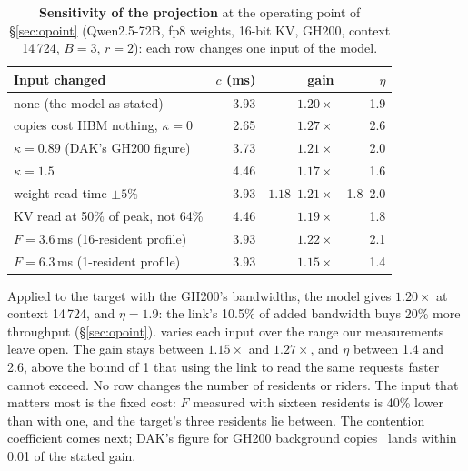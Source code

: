 \begin{table}[t]
\centering\small\setlength{\tabcolsep}{4pt}
\caption{\textbf{Sensitivity of the projection} at the operating point of
\S\ref{sec:opoint} (Qwen2.5-72B, fp8 weights, 16-bit KV, GH200, context
14\,724, $B{=}3$, $r{=}2$): each row changes one input of the model.}
\label{tab:sens}
\begin{tabular}{@{}l r r r@{}}
\toprule
Input changed & $c$ (ms) & gain & $\eta$ \\
\midrule
none (the model as stated)                  & 3.93 & $1.20\times$ & 1.9 \\
copies cost HBM nothing, $\kappa = 0$         & 2.65 & $1.27\times$ & 2.6 \\
$\kappa = 0.89$ (DAK's GH200 figure)         & 3.73 & $1.21\times$ & 2.0 \\
$\kappa = 1.5$                                & 4.46 & $1.17\times$ & 1.6 \\
weight-read time $\pm 5\%$                    & 3.93 & $1.18$--$1.21\times$ & 1.8--2.0 \\
KV read at 50\% of peak, not 64\%             & 4.46 & $1.19\times$ & 1.8 \\
$F = 3.6$\,ms (16-resident profile)           & 3.93 & $1.22\times$ & 2.1 \\
$F = 6.3$\,ms (1-resident profile)            & 3.93 & $1.15\times$ & 1.4 \\
\bottomrule
\end{tabular}
\end{table}

Applied to the target with the GH200's bandwidths, the model gives
$1.20\times$ at context 14\,724, and $\eta = 1.9$: the link's 10.5\% of added
bandwidth buys 20\% more throughput (\S\ref{sec:opoint}).
 varies each input over the range our measurements leave open.
The gain stays between $1.15\times$ and $1.27\times$, and $\eta$ between 1.4
and 2.6, above the bound of 1 that using the link to read the same requests
faster cannot exceed. No row changes the number of residents or riders. The
input that matters most is the fixed cost: $F$ measured with sixteen residents
is 40\% lower than with one, and the target's three residents lie between.
The contention coefficient comes next; DAK's figure for GH200 background
copies~\cite{dak} lands within 0.01 of the stated gain.

